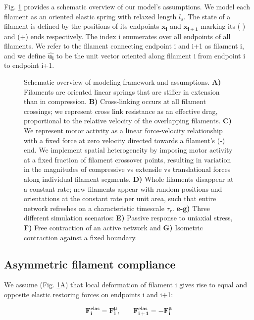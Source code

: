 \documentclass[10pt,letterpaper]{article}
\begin{document}
Fig. \ref{fig:model_overview} provides a schematic overview of our model's assumptions. We model each filament as an oriented elastic spring with relaxed length $l_s$. The state of a filament is defined by the positions of its endpoints $\mathbf{x_i}$ and $\mathbf{x_{i+1}}$ marking its (-) and (+) ends respectively. The index i enumerates over all endpoints of all filaments. We refer to the filament connecting endpoint i and i+1 as filament i, and we define $\mathbf{\hat{u_i}}$ to be the unit vector oriented along filament i from endpoint i to endpoint i+1.

\begin{figure}[h!]
	\centering
	\caption{\label{fig:model_overview} Schematic overview of modeling framework and assumptions. \textbf{A)} Filaments are oriented linear springs that are stiffer in extension than in compression. \textbf{B)} Cross-linking occurs at all filament crossings; we represent cross link resistance as an effective drag, proportional to the relative velocity of the overlapping filaments. \textbf{C)} We represent motor activity as a linear force-velocity relationship with a fixed force at zero velocity directed towards a filament's (-) end. We implement spatial heterogeneity by imposing motor activity at a fixed fraction of filament crossover points, resulting in variation in the magnitudes of compressive vs extensile vs translational forces along individual filament segments. \textbf{D)} Whole filaments disappear at a constant rate; new filaments appear with random positions and orientations at the constant rate per unit area, such that entire network refreshes on a characteristic timescale $\tau_r$. \textbf{e-g)} Three different simulation scenarios: \textbf{E)} Passive response to uniaxial stress, \textbf{F)} Free contraction of an active network and \textbf{G)} Isometric contraction against a fixed boundary. }
\end{figure}

\subsection*{Asymmetric filament compliance}
We assume (Fig. \ref{fig:model_overview}A) that local deformation of filament i gives rise to equal and opposite elastic restoring forces on endpoints i and i+1:

\begin{equation}
\label{eqn:internal}
\mathbf{F^{elas}_i} = \mathbf{F^{\mu}_{i}} 
\text{,} 
\qquad
\mathbf{F^{elas}_{i+1}} = \mathbf{-F^{\mu}_{i}}
\end{equation}
\end{document}
